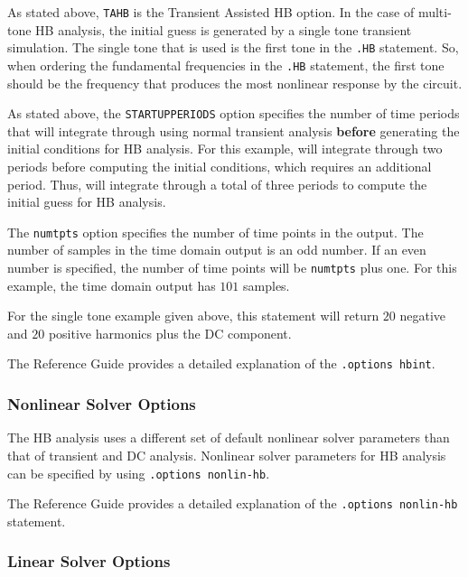As stated above, \texttt{TAHB} is the Transient Assisted HB option. In
the case of multi-tone HB analysis, the initial guess is generated by
a single tone transient simulation.  The single tone that is used is
the first tone in the \verb|.HB| statement.  So, when ordering the
fundamental frequencies in the \verb|.HB| statement, the first tone
should be the frequency that produces the most nonlinear response by
the circuit.

As stated above, the \texttt{STARTUPPERIODS} option specifies the
number of time periods that \Xyce{} will integrate through using
normal transient analysis \textbf{before} generating the initial
conditions for HB analysis.  For this example, \Xyce{} will integrate
through two periods before computing the initial conditions, which
requires an additional period.  Thus, \Xyce{} will integrate through a
total of three periods to compute the initial guess for HB analysis.

The \texttt{numtpts} option specifies the number of time points in the
output. The number of samples in the time domain output is an odd
number. If an even number is specified, the number of time points will
be \texttt{numtpts} plus one. For this example, the time domain output
has $101$ samples.


For the single tone example given above, this statement will return
$20$ negative and $20$ positive harmonics plus the DC component.

The \Xyce{} Reference Guide\ReferenceGuide{} provides a detailed
explanation of the \verb|.options hbint|.

\subsubsection{Nonlinear Solver Options}

The HB analysis uses a different set of default nonlinear solver
parameters than that of transient and DC analysis. Nonlinear solver
parameters for HB analysis can be specified by using
\verb|.options nonlin-hb|.


The \Xyce{} Reference Guide\ReferenceGuide{} provides a detailed
explanation of the \verb|.options nonlin-hb| statement.

\subsubsection{Linear Solver Options}

